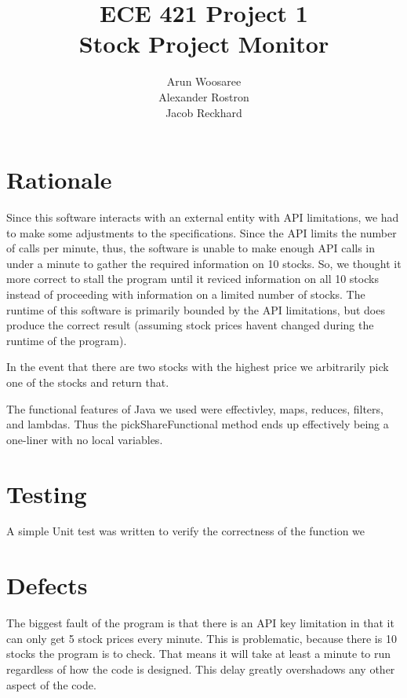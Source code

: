 \documentclass[letterpaper]{article}
\title{ECE 421 Project 1\\
Stock Project Monitor}
\author{Arun Woosaree\\
Alexander Rostron\\
Jacob Reckhard
}
\begin{document}
\maketitle %

\section{Rationale}
Since this software interacts with an external entity with API limitations, we
had to make some adjustments to the specifications. Since the API limits the
number of calls per minute, thus, the software is unable to make enough API
calls in under a minute to gather the required information on 10 stocks. So,
we thought it more correct to stall the program until it reviced information
on all 10 stocks instead of proceeding with information on a limited number of
stocks. The runtime of this software is primarily bounded by the API
limitations, but does produce the correct result (assuming stock prices
havent changed during the runtime of the program).

In the event that there are two stocks with the highest price we arbitrarily
pick one of the stocks and return that.

The functional features of Java we used were effectivley, maps, reduces,
filters, and lambdas. Thus the pickShareFunctional method ends up effectively
being a one-liner with no local variables.

\section{Testing}
A simple Unit test was written to verify the correctness of the function we

\section{Defects}

The biggest fault of the program is that there is an API key limitation in that
it can only get 5 stock prices every minute. This is problematic, because there
is 10 stocks the program is to check. That means it will take at least a minute
to run regardless of how the code is designed. This delay greatly overshadows
any other aspect of the code.
\end{document}
